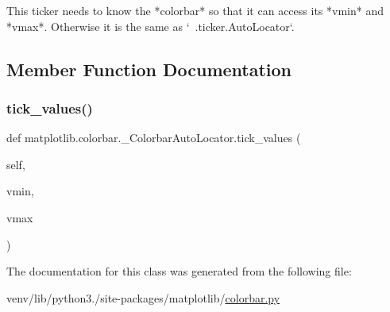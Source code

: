 \begin{DoxyVerb}This ticker needs to know the *colorbar* so that it can access
its *vmin* and *vmax*.  Otherwise it is the same as
`~.ticker.AutoLocator`.
\end{DoxyVerb}
 

\subsection{Member Function Documentation}
\mbox{\label{classmatplotlib_1_1colorbar_1_1__ColorbarAutoLocator_a7f3c83f7213196d8673ed7fc82a7dda5}} 
\subsubsection{\texorpdfstring{tick\+\_\+values()}{tick\_values()}}
{\footnotesize\ttfamily def matplotlib.\+colorbar.\+\_\+\+Colorbar\+Auto\+Locator.\+tick\+\_\+values (\begin{DoxyParamCaption}\item[{}]{self,  }\item[{}]{vmin,  }\item[{}]{vmax }\end{DoxyParamCaption})}



The documentation for this class was generated from the following file\+:\begin{DoxyCompactItemize}
\item 
venv/lib/python3./site-\/packages/matplotlib/\hyperlink{colorbar_8py}{colorbar.\+py}\end{DoxyCompactItemize}
